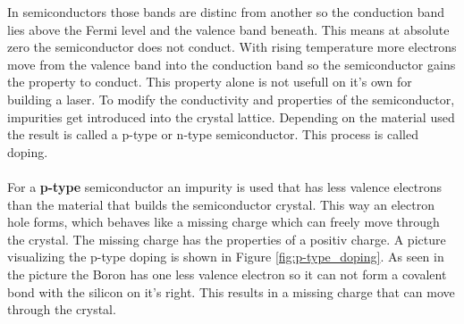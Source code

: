 In semiconductors those bands are distinc from another so the conduction band lies above the Fermi level and the valence band beneath.
This means at absolute zero the semiconductor does not conduct.
With rising temperature more electrons move from the valence band into the conduction band so the semiconductor gains the property to conduct.
This property alone is not usefull on it's own for building a laser.
To modify the conductivity and properties of the semiconductor, impurities get introduced into the crystal lattice.
Depending on the material used the result is called a p-type or n-type semiconductor.
This process is called doping.
\\\\
\FloatBarrier
For a \textbf{p-type} semiconductor an impurity is used that has less valence electrons than the material that builds the semiconductor crystal.
This way an electron hole forms, which behaves like a missing charge which can freely move through the crystal.
The missing charge has the properties of a positiv charge.
A picture visualizing the p-type doping is shown in Figure \ref{fig:p-type_doping}.
As seen in the picture the Boron has one less valence electron so it can not form a covalent bond with the silicon on it's right.
This results in a missing charge that can move through the crystal.
